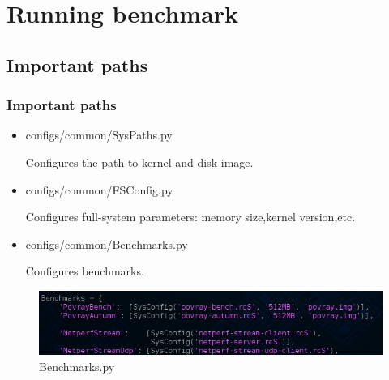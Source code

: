 \documentclass{beamer}
\begin{document}
\section{Running benchmark}
\subsection{Important paths}
\begin{frame}
    \frametitle{Important paths}
\begin{block}{}
    \begin{itemize}
	\item configs/common/SysPaths.py\par
	    Configures the path to kernel and disk image.
	\item configs/common/FSConfig.py\par
	    Configures full-system parameters: memory size,kernel version,etc.
	\item configs/common/Benchmarks.py\par
	    Configures benchmarks.
    \end{itemize}
    \end{block}
	\begin{figure}[H]
	    \begin{center}
		\includegraphics[scale=0.5]{back15.jpg}
	    \end{center}
	    \caption{Benchmarks.py}
	    \label{fig:bench}
	\end{figure}
\end{frame}
\end{document}
